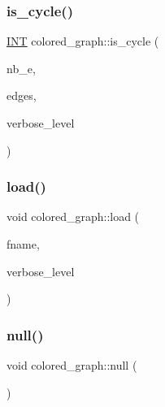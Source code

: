 \mbox{\label{classcolored__graph_abdaff45d4c5ecc114c6baf4f267e3815}} 
\subsubsection{\texorpdfstring{is\+\_\+cycle()}{is\_cycle()}}
{\footnotesize\ttfamily \mbox{\hyperlink{galois_8h_a09fddde158a3a20bd2dcadb609de11dc}{I\+NT}} colored\+\_\+graph\+::is\+\_\+cycle (\begin{DoxyParamCaption}\item[{\mbox{\hyperlink{galois_8h_a09fddde158a3a20bd2dcadb609de11dc}{I\+NT}}}]{nb\+\_\+e,  }\item[{\mbox{\hyperlink{galois_8h_a09fddde158a3a20bd2dcadb609de11dc}{I\+NT}} $\ast$}]{edges,  }\item[{\mbox{\hyperlink{galois_8h_a09fddde158a3a20bd2dcadb609de11dc}{I\+NT}}}]{verbose\+\_\+level }\end{DoxyParamCaption})}

\mbox{\label{classcolored__graph_aa777bb4ea083ac13058d746d63c7f128}} 
\subsubsection{\texorpdfstring{load()}{load()}}
{\footnotesize\ttfamily void colored\+\_\+graph\+::load (\begin{DoxyParamCaption}\item[{const \mbox{\hyperlink{galois_8h_ab6cc7b4aeb6ea31aba2b3fbfc83ff5e6}{B\+Y\+TE}} $\ast$}]{fname,  }\item[{\mbox{\hyperlink{galois_8h_a09fddde158a3a20bd2dcadb609de11dc}{I\+NT}}}]{verbose\+\_\+level }\end{DoxyParamCaption})}

\mbox{\label{classcolored__graph_ac73b077b50e6439a617aec3f1f3fd864}} 
\subsubsection{\texorpdfstring{null()}{null()}}
{\footnotesize\ttfamily void colored\+\_\+graph\+::null (\begin{DoxyParamCaption}{ }\end{DoxyParamCaption})}

